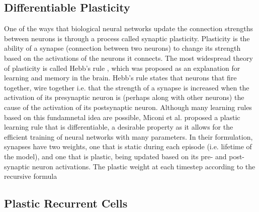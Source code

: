 \subsection*{Differentiable Plasticity}

One of the ways that biological neural networks update the connection strengths between neurons is through a process called synaptic plasticity. Plasticity is the ability of a synapse (connection between two neurons) to change its strength based on the activations of the neurons it connects. The most widespread theory of plasticity is called Hebb's rule \cite{hebb1949rule}, which was proposed as an explanation for learning and memory in the brain. Hebb's rule states that neurons that fire together, wire together i.e. that the strength of a synapse is increased when the activation of its presynaptic neuron is (perhaps along with other neurons) the cause of the activation of its postsynaptic neuron. Although many learning rules based on this fundamnetal idea are possible, Miconi et al. \cite{miconi2018diffplas} proposed a plastic learning rule that is differentiable, a desirable property as it allows for the efficient training of neural networks with many parameters. In their formulation, synapses have two weights, one that is static during each episode (i.e. lifetime of the model), and one that is plastic, being updated based on its pre- and post-synaptic neuron activations. The plastic weight at each timestep according to the recursive formula

\subsection*{Plastic Recurrent Cells}